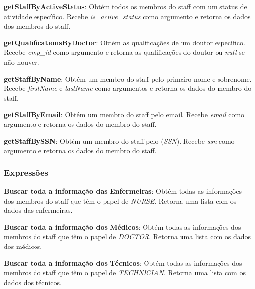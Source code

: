 \vspace{0.15cm}

\textbf{getStaffByActiveStatus}: Obtém todos os membros do staff com um status de atividade específico. Recebe \textit{is\_active\_status} como argumento e retorna os dados dos membros do staff.

\vspace{0.15cm}

\textbf{getQualificationsByDoctor}: Obtém as qualificações de um doutor específico. Recebe \textit{emp\_id} como argumento e retorna as qualificações do doutor ou \textit{null} se não houver.

\vspace{0.15cm}

\textbf{getStaffByName}: Obtém um membro do staff pelo primeiro nome e sobrenome. Recebe \textit{firstName} e \textit{lastName} como argumentos e retorna os dados do membro do staff.

\vspace{0.15cm}

\textbf{getStaffByEmail}: Obtém um membro do staff pelo email. Recebe \textit{email} como argumento e retorna os dados do membro do staff.

\vspace{0.15cm}

\textbf{getStaffBySSN}: Obtém um membro do staff pelo (\textit{SSN}). Recebe \textit{ssn} como argumento e retorna os dados do membro do staff.

\subsubsection{Expressões}

\textbf{Buscar toda a informação das Enfermeiras}: Obtém todas as informações dos membros do staff que têm o papel de \textit{NURSE}. Retorna uma lista com os dados das enfermeiras.

\vspace{0.15cm}

\textbf{Buscar toda a informação dos Médicos}: Obtém todas as informações dos membros do staff que têm o papel de \textit{DOCTOR}. Retorna uma lista com os dados dos médicos.

\vspace{0.15cm}

\textbf{Buscar toda a informação dos Técnicos}: Obtém todas as informações dos membros do staff que têm o papel de \textit{TECHNICIAN}. Retorna uma lista com os dados dos técnicos.

